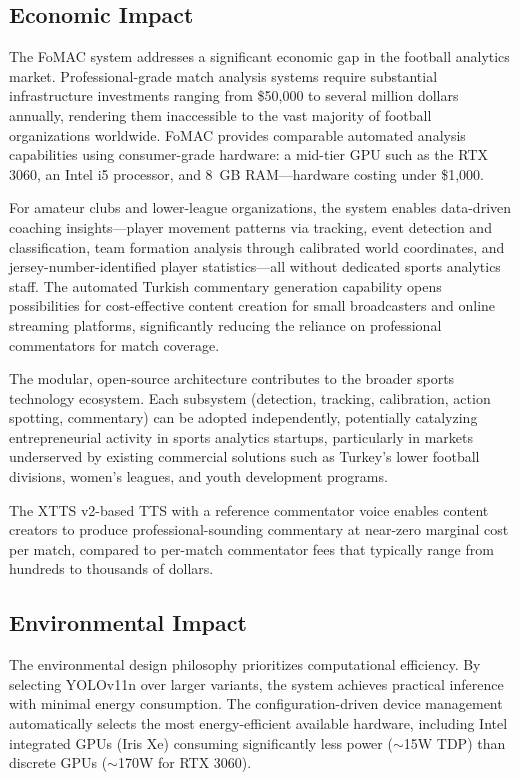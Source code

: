 \documentclass[10pt,twocolumn,a4paper]{article}
\begin{document}
\subsection{Economic Impact}

The FoMAC system addresses a significant economic gap in the football analytics market. Professional-grade match analysis systems require substantial infrastructure investments ranging from \$50,000 to several million dollars annually, rendering them inaccessible to the vast majority of football organizations worldwide. FoMAC provides comparable automated analysis capabilities using consumer-grade hardware: a mid-tier GPU such as the RTX 3060, an Intel i5 processor, and 8~GB RAM---hardware costing under \$1,000.

For amateur clubs and lower-league organizations, the system enables data-driven coaching insights---player movement patterns via tracking, event detection and classification, team formation analysis through calibrated world coordinates, and jersey-number-identified player statistics---all without dedicated sports analytics staff. The automated Turkish commentary generation capability opens possibilities for cost-effective content creation for small broadcasters and online streaming platforms, significantly reducing the reliance on professional commentators for match coverage.

The modular, open-source architecture contributes to the broader sports technology ecosystem. Each subsystem (detection, tracking, calibration, action spotting, commentary) can be adopted independently, potentially catalyzing entrepreneurial activity in sports analytics startups, particularly in markets underserved by existing commercial solutions such as Turkey's lower football divisions, women's leagues, and youth development programs.

The XTTS v2-based TTS with a reference commentator voice enables content creators to produce professional-sounding commentary at near-zero marginal cost per match, compared to per-match commentator fees that typically range from hundreds to thousands of dollars.

\subsection{Environmental Impact}

The environmental design philosophy prioritizes computational efficiency. By selecting YOLOv11n over larger variants, the system achieves practical inference with minimal energy consumption. The configuration-driven device management automatically selects the most energy-efficient available hardware, including Intel integrated GPUs (Iris Xe) consuming significantly less power ($\sim$15W TDP) than discrete GPUs ($\sim$170W for RTX 3060).
\end{document}

